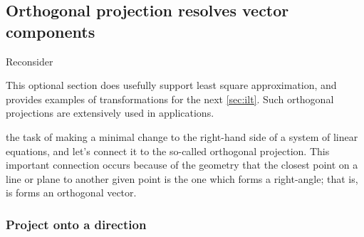 \subsection{Orthogonal projection resolves vector components}
\label{sec:proj}


\begin{comment}
\cite[p.738]{HughesHallett2013} \pooliv{p.27--8}
onto a vector, parallel and perpendicular components, work done
\pooliv{p.382}
orthogonal projections onto subspace, orthogonal decomposition thm,
\end{comment}

Reconsider \begin{aside}
This optional section does usefully support least square approximation, and provides examples of transformations for the next \autoref{sec:ilt}.
Such orthogonal projections are extensively used in applications.
\end{aside}%
the task of making a minimal change to the right-hand side of a system of linear equations, and let's connect it to the so-called orthogonal projection.
This important connection occurs because of the geometry that the closest point on a line or plane to another given point is the one which forms a right-angle; that is, is forms an orthogonal vector.


\subsubsection{Project onto a direction}

